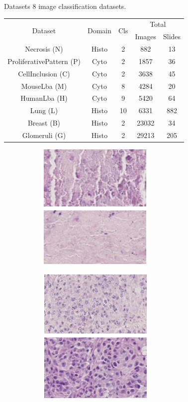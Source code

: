 \documentclass{beamer}
\begin{document}
\begin{frame}{Datasets}
8 image classification datasets. 

\begin{table}
    \center 
    \footnotesize
    \begin{tabular}{|c|c|c|cc|}
        \hline
        \multirow{2}{*}{Dataset} & \multirow{2}{*}{Domain} & \multirow{2}{*}{Cls} & \multicolumn{2}{c|}{Total} \\
        \cline{4-5}
        & & & Images & Slides \\
        \hline
        Necrosis (N) & Histo & 2 & 882 & 13 \\ %
        ProliferativePattern (P) & Cyto & 2 & 1857 & 36 \\ %
        CellInclusion (C) & Cyto & 2 & 3638 & 45 \\ %
        MouseLba  (M) & Cyto & 8 & 4284 & 20 \\ %
        HumanLba (H) & Cyto & 9 & 5420 & 64 \\ %
        Lung (L) & Histo & 10 & 6331 & 882 \\ %
        Breast (B) & Histo & 2 & 23032 & 34 \\ %
        Glomeruli (G) & Histo & 2 & 29213 & 205 \\ %
        \hline
    \end{tabular}
\end{table}
\begin{figure}
    \center
    \begin{subfigure}{0.1\textwidth}\includegraphics[scale=0.35]{images/illus_necrose.png}\end{subfigure}

\end{figure}
\end{frame}
\end{document}
